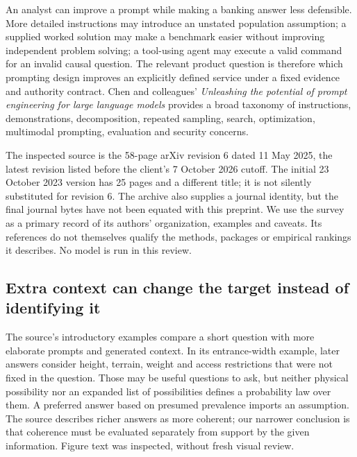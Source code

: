 An analyst can improve a prompt while making a banking answer less defensible.
More detailed instructions may introduce an unstated population assumption;
a supplied worked solution may make a benchmark easier without improving
independent problem solving; a tool-using agent may execute a valid command for
an invalid causal question. The relevant product question is therefore which
prompting design improves an explicitly defined service under a fixed evidence
and authority contract. Chen and colleagues' \emph{Unleashing the potential of
prompt engineering for large language models} provides a broad taxonomy of
instructions, demonstrations, decomposition, repeated sampling, search,
optimization, multimodal prompting, evaluation and security concerns.
\citep{exec24_promptengineering_original}

The inspected source is the 58-page arXiv revision 6 dated 11 May 2025, the
latest revision listed before the client's 7 October 2026 cutoff. The initial
23 October 2023 version has 25 pages and a different title; it is not silently
substituted for revision 6. The archive also supplies a journal identity, but
the final journal bytes have not been equated with this preprint. We use the
survey as a primary record of its authors' organization, examples and caveats.
Its references do not themselves qualify the methods, packages or empirical
rankings it describes. No model is run in this review.

\subsection{Extra context can change the target instead of identifying it}

The source's introductory examples compare a short question with more elaborate
prompts and generated context. In its entrance-width example, later answers
consider height, terrain, weight and access restrictions that were not fixed in
the question. Those may be useful questions to ask, but neither physical
possibility nor an expanded list of possibilities defines a probability law over
them. A preferred answer based on presumed prevalence imports an assumption.
The source describes richer answers as more coherent; our narrower conclusion
is that coherence must be evaluated separately from support by the given
information. Figure text was inspected, without fresh visual review.
\citep{exec24_promptengineering_original}

